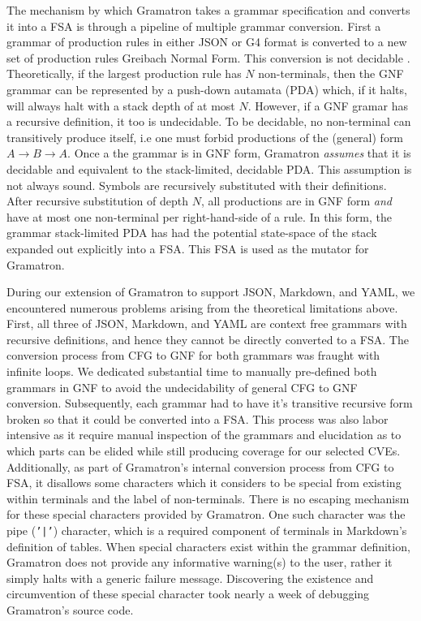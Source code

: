 \documentclass[12pt]{diazessay}
\begin{document}
The mechanism by which Gramatron takes a grammar specification and converts it into a FSA is through a pipeline of multiple grammar conversion.
First a grammar of production rules in either JSON or G4\cite{parr2013definitive} format is converted to a new set of production rules Greibach Normal Form.
This conversion is not decidable \cite{yu1997regular}.
Theoretically, if the largest production rule has $N$ non-terminals, then the GNF grammar can be represented by a push-down autamata (PDA) which, if it halts, will always halt with a stack depth of at most $N$.
However, if a GNF gramar has a recursive definition, it too is undecidable.
To be decidable, no non-terminal can transitively produce itself, i.e one must forbid productions of the (general) form $A \to B \to A$.
Once a the grammar is in GNF form, Gramatron \emph{assumes} that it is decidable and equivalent to the stack-limited, decidable PDA.
This assumption is not always sound.
Symbols are recursively substituted with their definitions.
After recursive substitution of depth $N$, all productions are in GNF form \emph{and} have at most one non-terminal per right-hand-side of a rule.
In this form, the grammar stack-limited PDA has had the potential state-space of the stack expanded out explicitly into a FSA.
This FSA is used as the mutator for Gramatron.

During our extension of Gramatron to support JSON, Markdown, and YAML, we encountered numerous problems arising from the theoretical limitations above.
First, all three of JSON, Markdown, and YAML are context free grammars with recursive definitions, and hence they cannot be directly converted to a FSA.
The conversion process from CFG to GNF for both grammars was fraught with infinite loops.
We dedicated substantial time to manually pre-defined both grammars in GNF to avoid the undecidability of general CFG to GNF conversion.
Subsequently, each grammar had to have it's transitive recursive form broken so that it could be converted into a FSA.
This process was also labor intensive as it require manual inspection of the grammars and elucidation as to which parts can be elided while still producing coverage for our selected CVEs.
Additionally, as part of Gramatron's internal conversion process from CFG to FSA, it disallows some characters which it considers to be special from existing within terminals and the label of non-terminals.
There is no escaping mechanism for these special characters provided by Gramatron.
One such character was the pipe (\texttt{'|'}) character, which is a required component of terminals in Markdown's definition of tables.
When special characters exist within the grammar definition, Gramatron does not provide any informative warning(s) to the user, rather it simply halts with a generic failure message.
Discovering the existence and circumvention of these special character took nearly a week of debugging Gramatron's source code.
\end{document}
